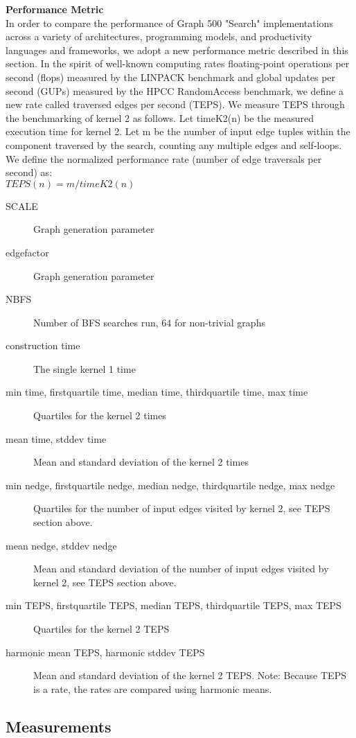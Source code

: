 \textbf{Performance Metric} \\
In order to compare the performance of Graph 500 "Search" implementations across a variety of architectures, programming models, and productivity languages and frameworks, we adopt a new performance metric described in this section. In the spirit of well-known computing rates floating-point operations per second (flops) measured by the LINPACK benchmark and global updates per second (GUPs) measured by the HPCC RandomAccess benchmark, we define a new rate called traversed edges per second (TEPS). We measure TEPS through the benchmarking of kernel 2 as follows. Let timeK2(n) be the measured execution time for kernel 2. Let m be the number of input edge tuples within the component traversed by the search, counting any multiple edges and self-loops. We define the normalized performance rate (number of edge traversals per second) as:
\\
$TEPS(n) = m / timeK2(n)$
\begin{description}
\item[SCALE] Graph generation parameter
\item[edgefactor] Graph generation parameter
\item[NBFS] Number of BFS searches run, 64 for non-trivial graphs
\item[construction time] The single kernel 1 time
\item[min time, firstquartile time, median time, thirdquartile time, max time] Quartiles for the kernel 2 times
\item[mean time, stddev time] Mean and standard deviation of the kernel 2 times
\item[min nedge, firstquartile nedge, median nedge, thirdquartile nedge, max nedge] Quartiles for the number of input edges visited by kernel 2, see TEPS section above.
\item[mean nedge, stddev nedge] Mean and standard deviation of the number of input edges visited by kernel 2, see TEPS section above.
\item[min TEPS, firstquartile TEPS, median TEPS, thirdquartile TEPS, max TEPS]  Quartiles for the kernel 2 TEPS
\item[harmonic mean TEPS, harmonic stddev TEPS] Mean and standard deviation of the kernel 2 TEPS. Note: Because TEPS is a rate, the rates are compared using harmonic means.
\end{description}


\subsection{Measurements}
